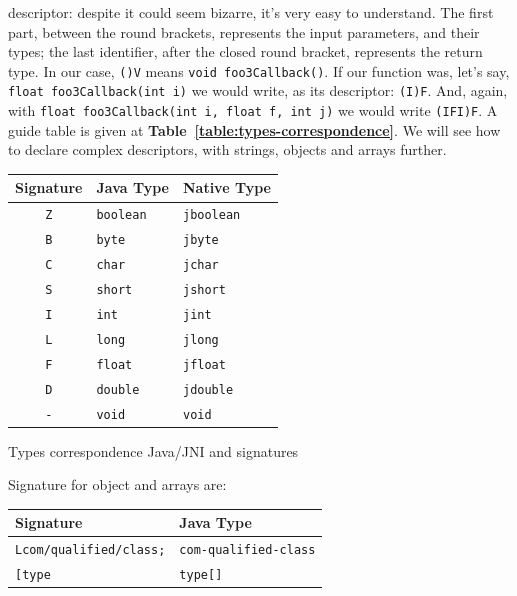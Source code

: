 \documentclass[a4paper,10pt]{article}
\makeatletter
\newenvironment{tablehere}{\def\@captype{table}}{}
\newcommand{\keyword}[1]{\texttt{#1}}
\newcommand{\reft}[1]{\textbf{Table~\ref{#1}}}
\makeatother
\begin{document}
\begin{multicols}{2}
\begin{itemize}
descriptor: despite it could seem bizarre, it's very easy to understand. The
first part, between the round brackets, represents the input parameters, and
their types; the last identifier, after the closed round bracket, represents
the return type. In our case, \keyword{()V} means \keyword{void foo3Callback()}.
If our function was, let's say, \keyword{float foo3Callback(int i)} we would
write, as its descriptor: \keyword{(I)F}. And, again, with
\keyword{float foo3Callback(int i, float f, int j)} we would write
\keyword{(IFI)F}. A guide table is given at \reft{table:types-correspondence}.
We will see how to declare complex descriptors, with strings, objects and arrays
further.
\end{itemize}
\vspace{1em}
\begin{tablehere}
	\centering	
	\begin{tabular}{c l p{2cm}}
		\hline
		Signature & Java Type & Native Type \\
		\hline
		\texttt{Z} & \texttt{boolean} & \texttt{jboolean} \\
		\texttt{B} & \texttt{byte} & \texttt{jbyte} \\
		\texttt{C} & \texttt{char} & \texttt{jchar} \\
		\texttt{S} & \texttt{short} & \texttt{jshort} \\
		\texttt{I} & \texttt{int} & \texttt{jint} \\
		\texttt{L} & \texttt{long} & \texttt{jlong} \\
		\texttt{F} & \texttt{float} & \texttt{jfloat} \\
		\texttt{D} & \texttt{double} & \texttt{jdouble} \\
		\texttt{-} & \texttt{void} & \texttt{void} \\
		\hline
	\end{tabular}
	\caption{Types correspondence Java/JNI and signatures}
	\label{table:types-correspondence}
\end{tablehere}
\vspace{1em}
Signature for object and arrays are:\\
\vspace{1em}
\begin{tablehere}
	\centering
	\begin{tabular}{l l}
		\hline
		Signature & Java Type\\
		\hline
		\texttt{Lcom/qualified/class;} & \texttt{com-qualified-class}\\
		\texttt{[type} & \texttt{type[]}\\
		\hline
	\end{tabular}
\end{tablehere}


\end{multicols}
\end{document}
